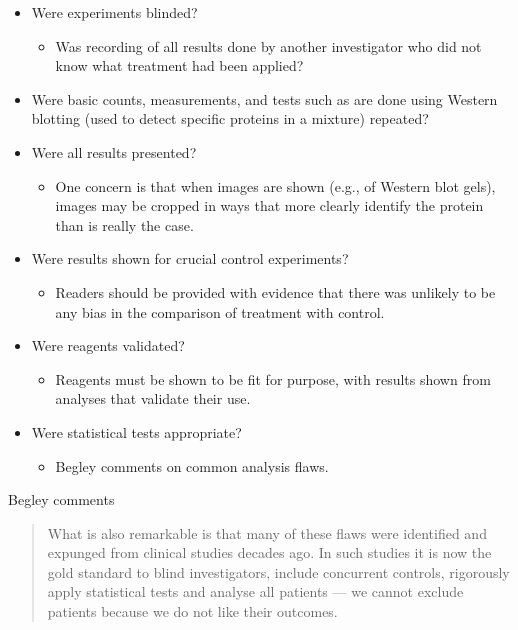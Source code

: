\documentclass[
  10pt,
  b5paper]{book}
\providecommand{\tightlist}{%
  \setlength{\itemsep}{0pt}\setlength{\parskip}{0pt}}
\begin{document}
\begin{itemize}
\tightlist
\item
  Were experiments blinded?

  \begin{itemize}
  \tightlist
  \item
    Was recording of all results done by another investigator
    who did not know what treatment had been applied?
  \end{itemize}
\item
  Were basic counts, measurements, and tests such as are done
  using Western blotting (used to detect specific proteins in a
  mixture) repeated?
\item
  Were all results presented?

  \begin{itemize}
  \tightlist
  \item
    One concern is that when images are shown (e.g., of Western
    blot gels), images may be cropped in ways that more clearly
    identify the protein than is really the case.
  \end{itemize}
\item
  Were results shown for crucial control experiments?

  \begin{itemize}
  \tightlist
  \item
    Readers should be provided with evidence that there was
    unlikely to be any bias in the comparison of treatment
    with control.
  \end{itemize}
\item
  Were reagents validated?

  \begin{itemize}
  \tightlist
  \item
    Reagents must be shown to be fit for purpose, with results
    shown from analyses that validate their use.
  \end{itemize}
\item
  Were statistical tests appropriate?

  \begin{itemize}
  \tightlist
  \item
    Begley comments on common analysis flaws.
  \end{itemize}
\end{itemize}

Begley comments

\begin{quote}
What is also remarkable is that many of these flaws were
identified and expunged from clinical studies decades ago.
In such studies it is now the gold standard to blind investigators,
include concurrent controls, rigorously apply statistical tests
and analyse all patients --- we cannot exclude patients because
we do not like their outcomes.
\end{quote}
\end{document}
